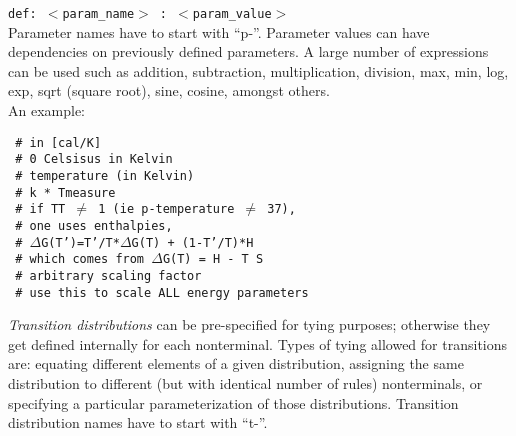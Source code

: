 \texttt{def: $<$param\_name$>$ : $<$param\_value$>$}\\

\noindent
Parameter names have to start with ``p-''. Parameter values can have
dependencies on previously defined parameters.  A large number of
expressions can be used such as addition, subtraction, multiplication,
division, max, min, log, exp, sqrt (square root), sine, cosine,
amongst others. \\

\noindent
An example:\\

\begin{footnotesize}
\noindent
\texttt{                              \# in [cal/K] }\\
\texttt{                               \# 0 Celsisus in Kelvin}\\
\texttt{                           \# temperature (in Kelvin)}\\
\texttt{              \# k * Tmeasure}\\
\texttt{  \# if TT $\neq$ 1 (ie p-temperature $\neq$ 37), }\\
\texttt{\makebox[92mm]{}                                                                 \# one uses enthalpies, }\\
\texttt{\makebox[92mm]{}                                                                 \# $\Delta$G(T')=T'/T*$\Delta$G(T) + (1-T'/T)*H}\\
\texttt{\makebox[92mm]{}                                                                \# which comes from $\Delta$G(T) = H - T S}\\
\texttt{                               \# arbitrary scaling factor}\\
\texttt{                       \# use this to scale ALL energy parameters}\\
\end{footnotesize}


 \textsl{Transition distributions}
can be pre-specified for tying purposes; otherwise they get defined
internally for each nonterminal.  Types of tying allowed for
transitions are: equating different elements of a given distribution,
assigning the same distribution to different (but with identical
number of rules) nonterminals, or specifying a particular
parameterization of those distributions. Transition distribution names
have to start with ``t-''.\\

